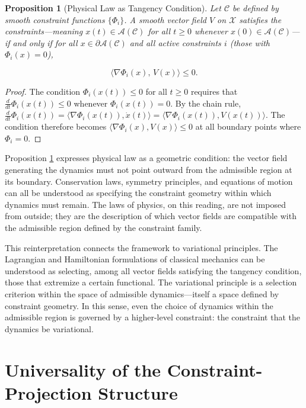 \documentclass[12pt, a4paper, oneside]{article}
\theoremstyle{plain}
\newtheorem{proposition}[theorem]{Proposition}
\theoremstyle{definition}
\theoremstyle{remark}
\newcommand{\X}{\mathcal{X}}
\newcommand{\C}{\mathcal{C}}
\newcommand{\A}{\mathcal{A}}
\begin{document}
\begin{proposition}[Physical Law as Tangency Condition]
\label{prop:tangency}
Let $\C$ be defined by smooth constraint functions $\{\Phi_i\}$. A smooth vector field $V$ on $\X$ satisfies the constraints---meaning $x(t) \in \A(\C)$ for all $t \geq 0$ whenever $x(0) \in \A(\C)$---if and only if for all $x \in \partial \A(\C)$ and all active constraints $i$ (those with $\Phi_i(x) = 0$),

\begin{equation}
\langle \nabla \Phi_i(x),\, V(x) \rangle \leq 0.
\end{equation}
\end{proposition}

\begin{proof}
The condition $\Phi_i(x(t)) \leq 0$ for all $t \geq 0$ requires that $\frac{d}{dt}\Phi_i(x(t)) \leq 0$ whenever $\Phi_i(x(t)) = 0$. By the chain rule, $\frac{d}{dt}\Phi_i(x(t)) = \langle \nabla \Phi_i(x(t)), \dot{x}(t) \rangle = \langle \nabla \Phi_i(x(t)), V(x(t)) \rangle$. The condition therefore becomes $\langle \nabla \Phi_i(x), V(x) \rangle \leq 0$ at all boundary points where $\Phi_i = 0$.
\end{proof}

Proposition \ref{prop:tangency} expresses physical law as a geometric condition: the vector field generating the dynamics must not point outward from the admissible region at its boundary. Conservation laws, symmetry principles, and equations of motion can all be understood as specifying the constraint geometry within which dynamics must remain. The laws of physics, on this reading, are not imposed from outside; they are the description of which vector fields are compatible with the admissible region defined by the constraint family.

This reinterpretation connects the framework to variational principles. The Lagrangian and Hamiltonian formulations of classical mechanics can be understood as selecting, among all vector fields satisfying the tangency condition, those that extremize a certain functional. The variational principle is a selection criterion within the space of admissible dynamics---itself a space defined by constraint geometry. In this sense, even the choice of dynamics within the admissible region is governed by a higher-level constraint: the constraint that the dynamics be variational.

\section{Universality of the Constraint-Projection Structure}
\end{document}
